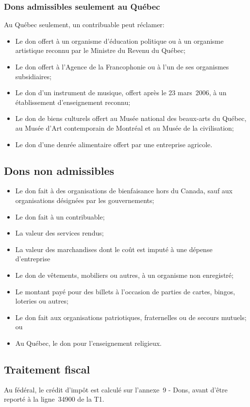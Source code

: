 \subsubsection{Dons admissibles seulement au Québec}
Au Québec seulement, un contribuable peut réclamer:
\begin{itemize}[label=]
	\item Le don offert à un organisme d'éducation politique ou à un organisme artistique reconnu par le Ministre du Revenu du Québec;
	\item Le don offert à l'Agence de la Francophonie ou à l'un de ses organismes subsidiaires;
	\item Le don d'un instrument de musique, offert après le 23 mars~2006, à un établissement d'enseignement reconnu;
	\item Le don de biens culturels offert au Musée national des beaux-arts du Québec, au Musée d'Art contemporain de Montréal et au Musée de la civilisation;
	\item Le don d'une denrée alimentaire offert par une entreprise agricole.
\end{itemize}


\subsection{Dons non admissibles}
\begin{itemize}[label=]
	\item Le don fait à des organisations de bienfaisance hors du Canada, sauf aux organisations désignées par les gouvernements;
	\item Le don fait à un contribuable;
	\item La valeur des services rendus;
	\item La valeur des marchandises dont le coût est imputé à une dépense d'entreprise 
	\item Le don de vêtements, mobiliers ou autres, à un organisme non enregistré;
	\item Le montant payé pour des billets à l'occasion de parties de cartes, bingos, loteries ou autres;
	\item Le don fait aux organisations patriotiques, fraternelles ou de secours mutuels; ou
	\item Au Québec, le don pour l'enseignement religieux.
\end{itemize}


\subsection{Traitement fiscal}
Au fédéral, le crédit d'impôt est calculé sur l'annexe~9 - Dons, avant d'être reporté à la ligne~34900 de la T1.

